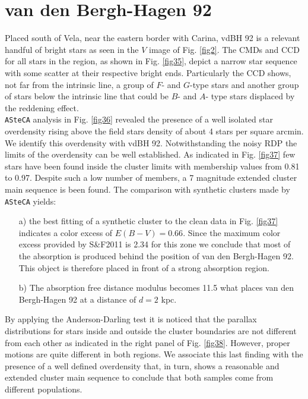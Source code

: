 \documentclass[draft]{aa}
\begin{document}
\section{van den Bergh-Hagen 92}

Placed south of Vela, near the eastern border with Carina, vdBH
92 is a relevant handful of bright stars as seen in the $V$ image of Fig.
\ref{fig2}. The CMDs and CCD for all stars in the region, as shown in Fig.
\ref{fig35}, depict a narrow star sequence with some scatter at their respective
bright ends. Particularly the CCD shows, not far from the intrinsic line, a
group of $F$- and $G$-type stars and another group of stars below the intrinsic
line that could be $B$- and $A$- type stars displaced by the reddening effect.\\

\texttt{ASteCA} analysis in Fig. \ref{fig36} revealed the presence of a well
isolated star overdensity rising above the field stars density of about 4
stars per square arcmin. We identify this overdensity with vdBH
92. Notwithstanding the noisy RDP the limits of the overdensity can be well
established. As indicated in Fig. \ref{fig37} few stars have been found inside
the cluster limits with membership values from 0.81 to 0.97. Despite such a low
number of members, a 7 magnitude extended cluster main sequence is been found.
The comparison with synthetic clusters made by \texttt{ASteCA} yields:

\begin{itemize}
\item [a)] the best fitting of a synthetic cluster to the clean data in Fig. 
    \ref{fig37} indicates a color excess of $E(B-V) = 0.66$. Since the
    maximum color excess provided by S\&F2011 is 2.34 for this zone we
    conclude that most of the absorption is produced behind the position of van
    den Bergh-Hagen 92. This object is therefore placed in front of a strong
    absorption region.
\item [b)] The absorption free distance modulus becomes 11.5 what places van den
    Bergh-Hagen 92 at a distance of $d=2$ kpc.
\end{itemize}

By applying the Anderson-Darling test it is noticed that the parallax
distributions for stars inside and outside the cluster boundaries are not
different from each other as indicated in the right panel of Fig. 
\ref{fig38}. However, proper motions are quite different in both regions. We
associate this last finding with the presence of a well defined overdensity
that, in turn, shows a reasonable and extended cluster main sequence to
conclude that both samples come from different populations.\\
\end{document}
